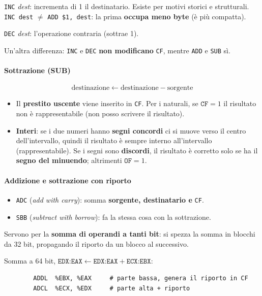 \documentclass[11pt,a4paper]{article}
\begin{document}
\texttt{INC} \emph{dest}: incrementa di 1 il destinatario. Esiste per motivi storici e strutturali. \texttt{INC dest} $\neq$ \texttt{ADD \$1, dest}: la prima \textbf{occupa meno byte} (è più compatta).

\texttt{DEC} \emph{dest}: l'operazione contraria (sottrae 1).

\begin{integrazione}
Un'altra differenza: \texttt{INC} e \texttt{DEC} \textbf{non modificano} \texttt{CF}, mentre \texttt{ADD} e \texttt{SUB} sì.
\end{integrazione}

\paragraph*{Sottrazione (SUB)}

\[
\text{destinazione} \leftarrow \text{destinazione} - \text{sorgente}
\]
\begin{itemize}[leftmargin=*]
  \item Il \textbf{prestito uscente} viene inserito in \texttt{CF}. Per i naturali, se $\texttt{CF}=1$ il risultato non è rappresentabile (non posso scrivere il risultato).
  \item \textbf{Interi}: se i due numeri hanno \textbf{segni concordi} ci si muove verso il centro dell'intervallo, quindi il risultato è sempre interno all'intervallo (rappresentabile). Se i segni sono \textbf{discordi}, il risultato è corretto solo se ha il \textbf{segno del minuendo}; altrimenti $\texttt{OF}=1$.
\end{itemize}

\paragraph*{Addizione e sottrazione con riporto}

\begin{itemize}[leftmargin=*]
  \item \texttt{ADC} (\emph{add with carry}): somma \textbf{sorgente, destinatario e} \texttt{CF}.
  \item \texttt{SBB} (\emph{subtract with borrow}): fa la stessa cosa con la sottrazione.
\end{itemize}

Servono per la \textbf{somma di operandi a tanti bit}: si spezza la somma in blocchi da 32 bit, propagando il riporto da un blocco al successivo.

\begin{integrazione}
Somma a 64 bit, $\texttt{EDX:EAX} \leftarrow \texttt{EDX:EAX} + \texttt{ECX:EBX}$:
\begin{lstlisting}
        ADDL  %EBX, %EAX     # parte bassa, genera il riporto in CF
        ADCL  %ECX, %EDX     # parte alta + riporto
\end{lstlisting}
\end{integrazione}
\end{document}
